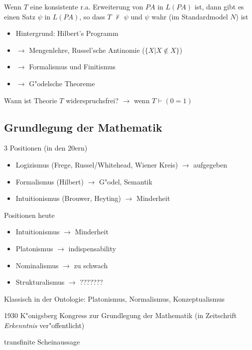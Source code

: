 \documentclass[]{scrartcl}
\begin{document}
Wenn $T$ eine konsistente r.a. Erweiterung von $PA$ in $L(PA)$ ist, dann gibt es einen Satz $\psi$ in $L(PA)$, so dass $T$ $\not \vdash$ $\psi$ und $\psi$ wahr (im Standardmodel $N$) ist

\begin{itemize}
  \item Hintergrund: Hilbert's Programm
  \item $\rightarrow$ Mengenlehre, Russel'sche Antinomie ($\{ X | X \notin X \}$)
  \item $\rightarrow$ Formalismus und Finitismus
  \item $\rightarrow$ G"odelsche Theoreme
\end{itemize}

Wann ist Theorie $T$ widerspruchsfrei? $\rightarrow$ wenn $T \vdash (0 = 1)$


\subsection{Grundlegung der Mathematik}

3 Positionen (in den 20ern)

\begin{itemize}
  \item Logizismus (Frege, Russel/Whitehead, Wiener Kreis) $\rightarrow$ aufgegeben
  \item Formalismus (Hilbert) $\rightarrow$ G"odel, Semantik
  \item Intuitionismus (Brouwer, Heyting) $\rightarrow$ Minderheit
\end{itemize}

Positionen heute

\begin{itemize}
  \item Intuitionismus $\rightarrow$ Minderheit
  \item Platonismus  $\rightarrow$ indispensability
  \item Nominalismus $\rightarrow$ zu schwach
  \item Strukturalismus $\rightarrow$ ???????
  
\end{itemize}

Klassisch in der Ontologie: Platonismus, Normalismus, Konzeptualismus
\newline

1930 K"onigsberg Kongress zur Grundlegung der Mathematik (in Zeitschrift \emph{Erkenntnis} ver"offentlicht)

transfinite Scheinaussage
\end{document}
